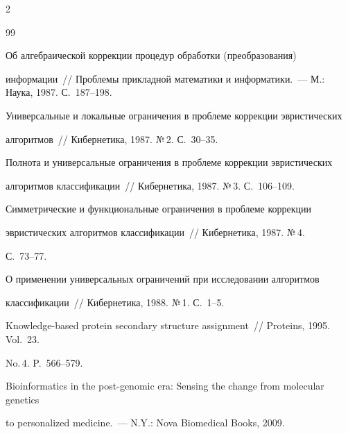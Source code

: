 \begin{multicols}{2}
{{\begin{thebibliography}{99}


Об алгебраической коррекции процедур обработки (преобразования) 

информации~// Проблемы прикладной математики и информатики.~--- М.: Наука, 1987. С.~187--198.





Универсальные и локальные ограничения в проблеме коррекции эвристических 

алгоритмов~// Кибернетика, 1987. №\,2. С.~30--35.





Полнота и универсальные ограничения в проблеме коррекции эвристических 

алгоритмов классификации~// Кибернетика, 1987. №\,3. С.~106--109.





Симметрические и функциональные ограничения в проблеме коррекции 

эвристических алгоритмов классификации~// Кибернетика, 1987. №\,4. 

С.~73--77.





О применении универсальных ограничений при исследовании алгоритмов 

классификации~// Кибернетика, 1988. №\,1. С.~1--5.





Knowledge-based protein secondary structure assignment~// Proteins, 1995. Vol.~23. 

No.\,4. P.~566--579.





Bioinformatics in the post-genomic era: Sensing the change from molecular genetics 

to personalized medicine.~--- N.Y.: Nova Biomedical Books, 2009. 


\end{thebibliography}}}
\end{multicols}

